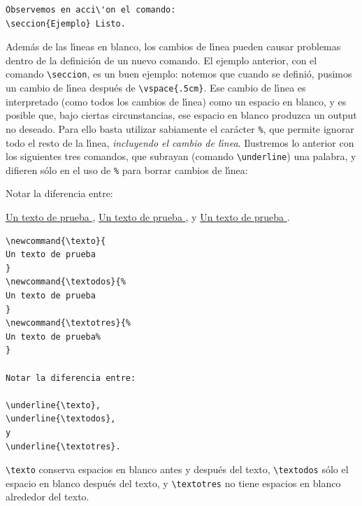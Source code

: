 {{\begin{minipage}[t]{5cm}
\begin{verbatim}
Observemos en acci\'on el comando: 
\seccion{Ejemplo} Listo.
\end{verbatim}
\end{minipage}
}
\vspace{.3cm}

Adem\'as de las l\'{\i}neas en blanco, los cambios de l\'{\i}nea
pueden causar problemas dentro de la definici\'on de un nuevo
comando. El ejemplo anterior, con el comando \verb+\seccion+, es un
buen ejemplo: notemos que cuando se defini\'o, pusimos un cambio de
l\'{\i}nea despu\'es de \verb+\vspace{.5cm}+. Ese cambio de
l\'{\i}nea es interpretado (como todos los cambios de l\'{\i}nea) como
un espacio en blanco, y es posible que, bajo ciertas circunstancias,
ese espacio en blanco produzca un output no deseado. Para ello basta
utilizar sabiamente el car\'acter \verb+%+, que permite ignorar todo
el resto de la l\'{\i}nea, {\em incluyendo el cambio de
  l\'{\i}nea}. Ilustremos lo anterior con los siguientes tres
comandos, que subrayan (comando \verb+\underline+) una palabra, y 
difieren s\'olo en el uso de \verb+%+ para borrar
cambios de l\'{\i}nea:

\vspace{.3cm}
{\small
\begin{minipage}[t]{4cm}
\newcommand{\texto}{
Un texto de prueba
}
\newcommand{\textodos}{%
Un texto de prueba
}
\newcommand{\textotres}{%
Un texto de prueba%
}

Notar la diferencia entre: 

\underline{\texto},
\underline{\textodos}, 
y 
\underline{\textotres}.
\end{minipage}
\hspace{1.5cm}
\begin{minipage}[t]{5cm}
\begin{verbatim}
\newcommand{\texto}{
Un texto de prueba
}
\newcommand{\textodos}{%
Un texto de prueba
}
\newcommand{\textotres}{%
Un texto de prueba%
}

Notar la diferencia entre: 

\underline{\texto},
\underline{\textodos}, 
y 
\underline{\textotres}.
\end{verbatim}
\end{minipage}
}
\vspace{.3cm}

\verb+\texto+ conserva espacios en blanco antes y despu\'es del texto,
\verb+\textodos+ s\'olo el espacio en blanco despu\'es del texto, y
\verb+\textotres+ no tiene espacios en blanco alrededor del texto.


}
